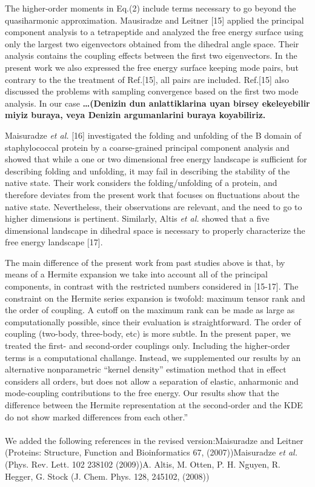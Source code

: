 \documentclass[12pt,article]{iopart}
\begin{document}
The higher-order moments in Eq.(2) include terms necessary to go
beyond the quasiharmonic approximation. Mausiradze and Leitner [15]
applied the principal component analysis to a tetrapeptide and
analyzed the free energy surface using only the largest two
eigenvectors obtained from the dihedral angle space. Their analysis
contains the coupling effects between the first two eigenvectors. In
the present work we also expressed the free energy surface keeping
mode pairs, but contrary to the the treatment of Ref.[15], all pairs
are included. Ref.[15] also discussed the problems with sampling
convergence based on the first two mode analysis. In our case {\bf
  …(Denizin dun anlattiklarina uyan birsey ekeleyebilir miyiz buraya,
  veya Denizin argumanlarini buraya koyabiliriz.}

Maisuradze {\it et al.} [16] investigated the folding and unfolding of
the B domain of staphylococcal protein by a coarse-grained principal
component analysis and showed that while a one or two dimensional free
energy landscape is sufficient for describing folding and unfolding,
it may fail in describing the stability of the native state. Their
work considers the folding/unfolding of a protein, and therefore
deviates from the present work that focuses on fluctuations about the
native state. Nevertheless, their observations are relevant, and the
need to go to higher dimensions is pertinent. Similarly, Altis {\it et
  al.}  showed that a five dimensional landscape in dihedral space is
necessary to properly characterize the free energy landscape [17].

The main difference of the present work from past studies above is
that, by means of a Hermite expansion we take into account all of the
principal components, in contrast with the restricted numbers
considered in [15-17]. The constraint on the Hermite series expansion
is twofold: maximum tensor rank and the order of coupling. A cutoff on
the maximum rank can be made as large as computationally possible,
since their evaluation is straightforward. The order of coupling
(two-body, three-body, etc) is more subtle. In the present paper, we
treated the first- and second-order couplings only. Including the
higher-order terms is a computational challange. Instead, we
supplemented our results by an alternative nonparametric ``kernel
density'' estimation method that in effect considers all orders, but
does not allow a separation of elastic, anharmonic and mode-coupling
contributions to the free energy. Our results show that the difference
between the Hermite representation at the second-order and the KDE do
not show marked differences from each other.''\\ \\ 
%
We added the following references in the revised version:\newline [15]
Maisuradze and Leitner (Proteins: Structure, Function and
Bioinformatics 67, (2007))\newline [16] Maisuradze {\it et al.}
(Phys. Rev. Lett. 102 238102 (2009))\newline [17] A. Altis, M. Otten,
P. H. Nguyen, R. Hegger, G. Stock (J. Chem. Phys. 128, 245102, (2008))
\end{document}

